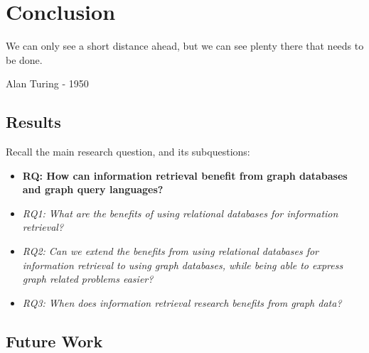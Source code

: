 \chapter{Conclusion}
\label{conclusion}
\epigraph{We can only see a short distance ahead, but we can see plenty there that needs to be done.}{Alan Turing - 1950}

\section{Results}
Recall the main research question, and its subquestions:
\begin{itemize}
	\item \textbf{RQ: How can information retrieval benefit from graph databases and graph query languages?}
	
	\item \emph{RQ1: What are the benefits of using relational databases for information retrieval?} 
	\item \emph{RQ2: Can we extend the benefits from using relational databases for information retrieval to using graph databases, while being able to express graph related problems easier?} 
	\item \emph{RQ3: When does information retrieval research benefits from graph data?} 
\end{itemize}

\section{Future Work}
